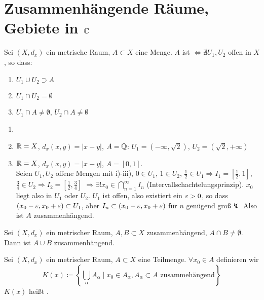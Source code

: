 \chapter{Zusammenh\"angende R\"aume,\\Gebiete in $ \mathbb{C} $}
\begin{definition}
Sei $ (X, d_x) $ ein metrische Raum, $ A\subset X $ eine Menge. $ A $ ist $ \Leftrightarrow\nexists U_1,U_2 $ offen in $ X $, so dass:
\begin{enumerate}
\item $ U_1\cup U_2\supset A $
\item $ U_1\cap U_2=\emptyset $
\item $ U_1\cap A\neq\emptyset $, $ U_2\cap A\neq\emptyset $
\end{enumerate}
\end{definition}
\begin{beispiel*}
\begin{enumerate}
\item[]
\item $ \mathbb{R}=X $, $ d_x(x,y)=|x-y| $, $ A=\mathbb{Q} $: $ U_1=(-\infty,\sqrt{2}) $, $ U_2=(\sqrt{2},+\infty) $
\item $ \mathbb{R}=X $, $ d_x(x,y)=|x-y| $, $ A=[0,1] $.\\
Seien $ U_1,U_2 $ offene Mengen mit i)-iii), $ 0\in U_1 $, $ 1\in U_2 $, $ \frac{1}{2}\in U_1 \Rightarrow I_1=\left[\frac{1}{2},1\right]$, $ \frac{3}{4}\in U_2\Rightarrow I_2=\left[\frac{1}{2},\frac{3}{4}\right]$ $\Rightarrow\exists! x_0\in\bigcap_{n=1}^\infty I_n $ (Intervallschachtelungsprinzip). $ x_0 $ liegt also in $ U_1 $ oder $ U_2 $. $ U_1 $ ist offen, also existiert ein $ \varepsilon>0 $, so dass $ (x_0-\varepsilon,x_0+\varepsilon)\subset U_1 $, aber $ I_n\subset(x_0-\varepsilon,x_0+\varepsilon) $ f\"ur $ n $ gen\"ugend gro\ss $\lightning $ Also ist $ A $ zusammenh\"angend.
\end{enumerate} 
\end{beispiel*}
\begin{bemerkung*}
Sei $ (X,d_x) $ ein metrischer Raum, $ A,B\subset X $ zusammenh\"angend, $ A\cap B\neq\emptyset $. Dann ist $ A\cup B $ zusammenh\"angend.
\end{bemerkung*}
\begin{definition}
Sei $ (X,d_x) $ ein metrischer Raum, $ A\subset X $ eine Teilmenge. $ \forall x_0\in A $ definieren wir \[ K(x)\coloneqq\left\lbrace\bigcup_\alpha A_\alpha\mid x_0\in A_\alpha, A_\alpha\subset A\text{ zusammeh\"angend} \right\rbrace \]
$ K(x) $ hei\ss t .
\end{definition}
